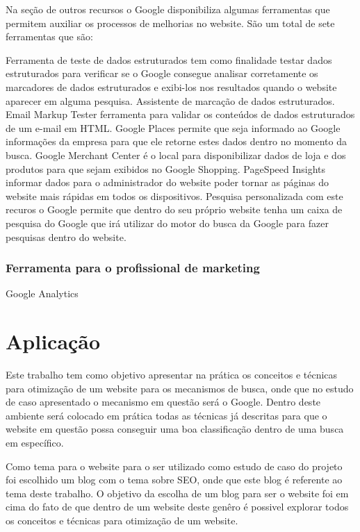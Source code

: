 \documentclass[
	12pt,				%
	openright,			%
	twoside,			%
	a4paper,			%
	english,			%
	french,				%
	spanish,			%
	brazil				%
	]{abntex2}
\begin{document}
Na seção de outros recursos o Google disponibiliza algumas ferramentas que permitem auxiliar os processos de melhorias no website. São um total de sete ferramentas que são: 

Ferramenta de teste de dados estruturados tem como finalidade testar dados estruturados para verificar se o Google consegue analisar corretamente os marcadores de dados estruturados e exibi-los nos resultados quando o website aparecer em alguma pesquisa.
Assistente de marcação de dados estruturados.
Email Markup Tester ferramenta para validar os conteúdos de dados estruturados de um e-mail em HTML.
Google Places permite que seja informado ao Google informações da empresa para que ele retorne estes dados dentro no momento da busca.
Google Merchant Center é o local para disponibilizar dados de loja e dos produtos para que sejam exibidos no Google Shopping.
PageSpeed Insights informar dados para o administrador do website poder tornar as páginas do website mais rápidas em todos os dispositivos.
Pesquisa personalizada com este recuros o Google permite que dentro do seu próprio website tenha um caixa de pesquisa do Google que irá utilizar do motor do busca da Google para fazer pesquisas dentro do website.

\subsection{Ferramenta para o profissional de marketing}

Google Analytics

\chapter{Aplicação}

Este trabalho tem como objetivo apresentar na prática os conceitos e técnicas para otimização de um website para os mecanismos de busca, onde que no estudo de caso apresentado o mecanismo em questão será o Google. Dentro deste ambiente será colocado em prática todas as técnicas já descritas para que o website em questão possa conseguir uma boa classificação dentro de uma busca em específico.

Como tema para o website para o ser utilizado como estudo de caso do projeto foi escolhido um blog com o tema sobre SEO, onde que este blog é referente ao tema deste trabalho. O objetivo da escolha de um blog para ser o website foi em cima do fato de que dentro de um website deste genêro é possivel explorar todos os conceitos e técnicas para otimização de um website.
\end{document}
